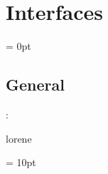 
\section{Interfaces} 


\parskip = 0pt

\vspace{3mm} \subsection*{General}

: 

lorene
\vspace{2mm}

\vspace{5mm}\parskip = 10pt 
